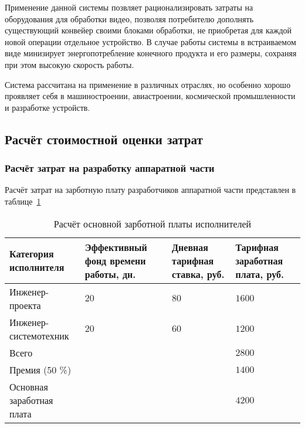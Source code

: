 Применение данной системы позвляет рационализировать затраты на оборудования для обработки видео,
позволяя потребителю дополнять существующий конвейер своими блоками обработки, не приобретая
для каждой новой операции отдельное устройство. В случае работы системы в встраиваемом виде
минизирует энергопотребление конечного продукта и его размеры, сохраняя при этом высокую скорость работы.

Система рассчитана на применение в различных отраслях, но особенно хорошо проявляет себя в машиностроении,
авиастроении, космической промышленности и разработке  устройств.

\subsection{Расчёт стоимостной оценки затрат}
\label{sec:economics:cost_estimation}

\subsubsection{Расчёт затрат на разработку аппаратной части}
\label{sec:economics:cost_estimation:hardware}

Расчёт затрат на зарботную плату разработчиков аппаратной части представлен в таблице~\ref{table:economics:cost_estimation:hardware:employee}

\begin{table}[ht]
  \caption{Расчёт основной зарботной платы исполнителей}
  \label{table:economics:cost_estimation:hardware:employee}
  \begin{tabular}{| >{\centering}m{}
                  | >{\centering}m{}
                  | >{\centering}m{}
                  | >{\centering\arraybackslash}m{}|}
   \hline
    Категория исполнителя & Эффективный фонд времени работы, дн. & Дневная тарифная ставка, руб. & Тарифная заработная плата, руб. \\
   \hline
    Инженер-проекта & $ 20 $ & $ 80 $ & $ 1600 $ \\
   \hline
    Инженер-системотехник & $ 20 $ & $ 60 $ & $ 1200 $ \\
   \hline
    Всего & & & $ 2800 $ \\
   \hline
    Премия (50 \%) & & & $ 1400 $ \\
   \hline
    Основная заработная плата & & & $ 4200 $  \\
   \hline
  \end{tabular}
\end{table}

